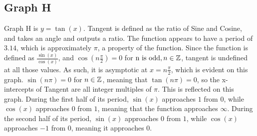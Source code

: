 \subsection{Graph H}

Graph H is $y=\tan(x)$.
Tangent is defined as the ratio of Sine and Cosine, and takes an angle and outputs a ratio.
The function appears to have a period of $3.14$, which is approximately $\pi$, a property of the function.
Since the function is defined as $\frac{\sin(x)}{\cos(x)}$, and ${\cos(n{\frac{\pi}{2}})=0}$ for ${\text{n is odd}, n\in \mathbb{Z}}$, tangent is undefined at all those values.
As such, it is asymptotic at $x={n{\frac{\pi}{2}}}$, which is evident on this graph.
${\sin(n\pi)=0}$ for ${n \in \mathbb{Z}}$, meaning that ${\tan(n{\pi})=0}$, so the x-intercepts of Tangent are all integer multiples of ${\pi}$.
This is reflected on this graph.
During the first half of its period, ${\sin(x)}$ approaches $1$ from $0$, while ${\cos(x)}$ approaches $0$ from $1$, meaning that the function approaches $\infty$.
During the second half of its period, ${\sin(x)}$ approaches $0$ from $1$, while ${\cos(x)}$ approaches $-1$ from $0$, meaning it approaches $0$.
